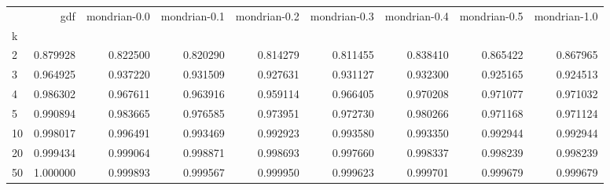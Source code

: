\begin{tabular}{lrrrrrrrr}
\toprule
{} &       gdf &  mondrian-0.0 &  mondrian-0.1 &  mondrian-0.2 &  mondrian-0.3 &  mondrian-0.4 &  mondrian-0.5 &  mondrian-1.0 \\
k  &           &               &               &               &               &               &               &               \\
\midrule
2  &  0.879928 &      0.822500 &      0.820290 &      0.814279 &      0.811455 &      0.838410 &      0.865422 &      0.867965 \\
3  &  0.964925 &      0.937220 &      0.931509 &      0.927631 &      0.931127 &      0.932300 &      0.925165 &      0.924513 \\
4  &  0.986302 &      0.967611 &      0.963916 &      0.959114 &      0.966405 &      0.970208 &      0.971077 &      0.971032 \\
5  &  0.990894 &      0.983665 &      0.976585 &      0.973951 &      0.972730 &      0.980266 &      0.971168 &      0.971124 \\
10 &  0.998017 &      0.996491 &      0.993469 &      0.992923 &      0.993580 &      0.993350 &      0.992944 &      0.992944 \\
20 &  0.999434 &      0.999064 &      0.998871 &      0.998693 &      0.997660 &      0.998337 &      0.998239 &      0.998239 \\
50 &  1.000000 &      0.999893 &      0.999567 &      0.999950 &      0.999623 &      0.999701 &      0.999679 &      0.999679 \\
\bottomrule
\end{tabular}
